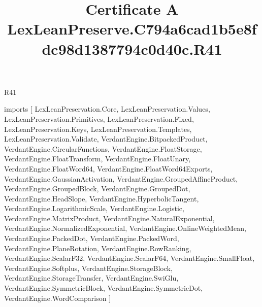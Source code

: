 \begin{lexlean}{R41}
\title{Certificate A LexLeanPreserve.C794a6cad1b5e8fdc98d1387794c0d40c.R41}
\begin{coremodule}
imports [
  LexLeanPreservation.Core,
  LexLeanPreservation.Values,
  LexLeanPreservation.Primitives,
  LexLeanPreservation.Fixed,
  LexLeanPreservation.Keys,
  LexLeanPreservation.Templates,
  LexLeanPreservation.Validate,
  VerdantEngine.BitpackedProduct,
  VerdantEngine.CircularFunctions,
  VerdantEngine.FloatStorage,
  VerdantEngine.FloatTransform,
  VerdantEngine.FloatUnary,
  VerdantEngine.FloatWord64,
  VerdantEngine.FloatWord64Exports,
  VerdantEngine.GaussianActivation,
  VerdantEngine.GroupedAffineProduct,
  VerdantEngine.GroupedBlock,
  VerdantEngine.GroupedDot,
  VerdantEngine.HeadSlope,
  VerdantEngine.HyperbolicTangent,
  VerdantEngine.LogarithmicScale,
  VerdantEngine.Logistic,
  VerdantEngine.MatrixProduct,
  VerdantEngine.NaturalExponential,
  VerdantEngine.NormalizedExponential,
  VerdantEngine.OnlineWeightedMean,
  VerdantEngine.PackedDot,
  VerdantEngine.PackedWord,
  VerdantEngine.PlaneRotation,
  VerdantEngine.RowRanking,
  VerdantEngine.ScalarF32,
  VerdantEngine.ScalarF64,
  VerdantEngine.SmallFloat,
  VerdantEngine.Softplus,
  VerdantEngine.StorageBlock,
  VerdantEngine.StorageTransfer,
  VerdantEngine.SwiGlu,
  VerdantEngine.SymmetricBlock,
  VerdantEngine.SymmetricDot,
  VerdantEngine.WordComparison
]


\end{coremodule}
\end{lexlean}
